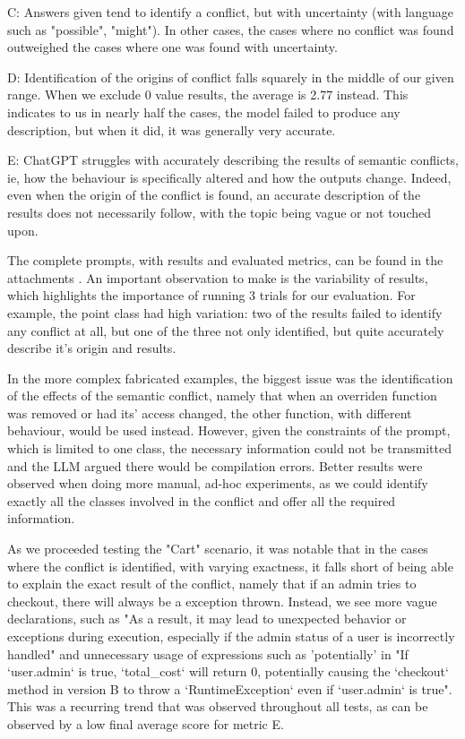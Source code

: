 C: Answers given tend to identify a conflict, but with uncertainty (with language such as "possible", "might"). In other cases, the cases where no conflict was found outweighed the cases where one was found with uncertainty.

D: Identification of the origins of conflict falls squarely in the middle of our given range.  When we exclude 0 value results, the average is 2.77 instead. This indicates to us in nearly half the cases, the model failed to produce any description, but when it did, it was generally very accurate.

E: ChatGPT struggles with accurately describing the results of semantic conflicts, ie, how the behaviour is specifically altered and how the outputs change. Indeed, even when the origin of the conflict is found, an accurate description of the results does not necessarily follow, with the topic being vague or not touched upon.

The complete prompts, with results and evaluated metrics, can be found in the attachments .
An important observation to make is the variability of results, which highlights the importance of running 3 trials for our evaluation.
For example, the point class had high variation: two of the results failed to identify any conflict at all, but one of the three not only identified, but quite accurately describe it's origin and results.

In the more complex fabricated examples, the biggest issue was the identification of the effects of the semantic conflict, namely that when an overriden function was removed or had its' access changed, the other function, with different behaviour, would be used instead. However, given the constraints of the prompt, which is limited to one class, the necessary information could not be transmitted and the LLM argued there would be compilation errors. 
Better results were observed when doing more manual, ad-hoc experiments, as we could identify exactly all the classes involved in the conflict and offer all the required information.

As we proceeded testing the "Cart" scenario, it was notable that in the cases where the conflict is identified, with varying exactness, it falls short of being able to explain the exact result of the conflict, namely that if an admin tries to checkout, there will always be a exception thrown. Instead, we see more vague declarations, such as "As a result, it may lead to unexpected behavior or exceptions during execution, especially if the admin status of a user is incorrectly handled" and unnecessary usage of expressions such as 'potentially' in "If `user.admin` is true, `total\_cost` will return 0, potentially causing the `checkout` method in version B to throw a `RuntimeException` even if `user.admin` is true".
This was a recurring trend that was observed throughout all tests, as can be observed by a low final average score for metric E.

